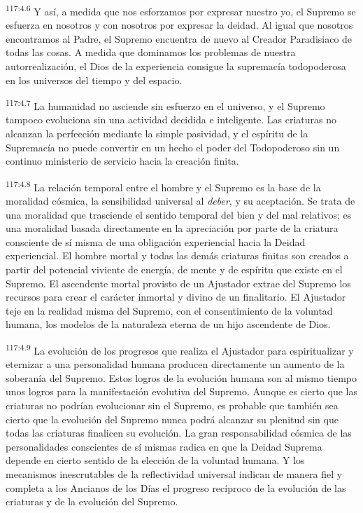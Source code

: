 \par
\textsuperscript{117:4.6} Y así, a medida que nos esforzamos por expresar nuestro yo, el Supremo se esfuerza en nosotros y con nosotros por expresar la deidad. Al igual que nosotros encontramos al Padre, el Supremo encuentra de nuevo al Creador Paradisiaco de todas las cosas. A medida que dominamos los problemas de nuestra autorrealización, el Dios de la experiencia consigue la supremacía todopoderosa en los universos del tiempo y del espacio.

\par
\textsuperscript{117:4.7} La humanidad no asciende sin esfuerzo en el universo, y el Supremo tampoco evoluciona sin una actividad decidida e inteligente. Las criaturas no alcanzan la perfección mediante la simple pasividad, y el espíritu de la Supremacía no puede convertir en un hecho el poder del Todopoderoso sin un continuo ministerio de servicio hacia la creación finita.

\par
\textsuperscript{117:4.8} La relación temporal entre el hombre y el Supremo es la base de la moralidad cósmica, la sensibilidad universal al \textit{deber}, y su aceptación. Se trata de una moralidad que trasciende el sentido temporal del bien y del mal relativos; es una moralidad basada directamente en la apreciación por parte de la criatura consciente de sí misma de una obligación experiencial hacia la Deidad experiencial. El hombre mortal y todas las demás criaturas finitas son creados a partir del potencial viviente de energía, de mente y de espíritu que existe en el Supremo. El ascendente mortal provisto de un Ajustador extrae del Supremo los recursos para crear el carácter inmortal y divino de un finalitario. El Ajustador teje en la realidad misma del Supremo, con el consentimiento de la voluntad humana, los modelos de la naturaleza eterna de un hijo ascendente de Dios.

\par
\textsuperscript{117:4.9} La evolución de los progresos que realiza el Ajustador para espiritualizar y eternizar a una personalidad humana producen directamente un aumento de la soberanía del Supremo. Estos logros de la evolución humana son al mismo tiempo unos logros para la manifestación evolutiva del Supremo. Aunque es cierto que las criaturas no podrían evolucionar sin el Supremo, es probable que también sea cierto que la evolución del Supremo nunca podrá alcanzar su plenitud sin que todas las criaturas finalicen su evolución. La gran responsabilidad cósmica de las personalidades conscientes de sí mismas radica en que la Deidad Suprema depende en cierto sentido de la elección de la voluntad humana. Y los mecanismos inescrutables de la reflectividad universal indican de manera fiel y completa a los Ancianos de los Días el progreso recíproco de la evolución de las criaturas y de la evolución del Supremo.

